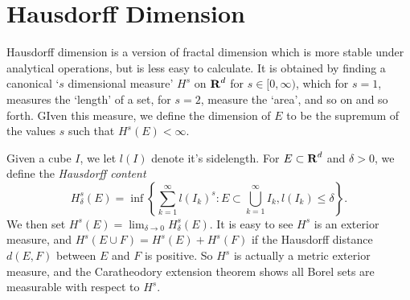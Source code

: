 \section{Hausdorff Dimension}

Hausdorff dimension is a version of fractal dimension which is more stable under analytical operations, but is less easy to calculate. It is obtained by finding a canonical `$s$ dimensional measure' $H^s$ on $\operatorname{\mathbf{R}}^d$ for $s \in [0,\infty)$, which for $s = 1$, measures the `length' of a set, for $s = 2$, measure the `area', and so on and so forth. GIven this measure, we define the dimension of $E$ to be the supremum of the values $s$ such that $H^s(E) < \infty$.

Given a cube $I$, we let $l(I)$ denote it's sidelength. For $E \subset \operatorname{\mathbf{R}}^d$ and $\delta > 0$, we define the \emph{Hausdorff content}
%
\[ H_\delta^s(E) = \inf \left\{ \sum_{k = 1}^\infty l(I_k)^s : E \subset \bigcup_{k = 1}^\infty I_k, l(I_k) \leq \delta \right\}. \]
%
We then set $H^s(E) = \lim_{\delta \to 0} H_\delta^s(E)$. It is easy to see $H^s$ is an exterior measure, and $H^s(E \cup F) = H^s(E) + H^s(F)$ if the Hausdorff distance $d(E,F)$ between $E$ and $F$ is positive. So $H^s$ is actually a metric exterior measure, and the Caratheodory extension theorem shows all Borel sets are measurable with respect to $H^s$.



